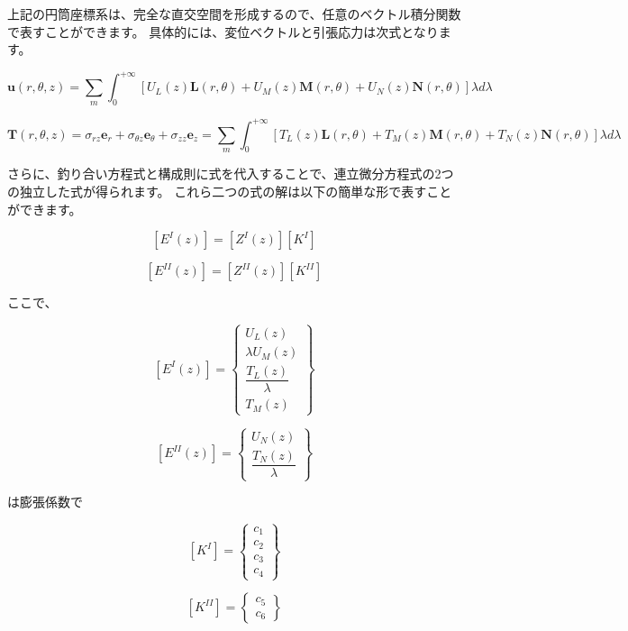 上記の円筒座標系は、完全な直交空間を形成するので、任意のベクトル積分関数で表すことができます。
具体的には、変位ベクトルと引張応力は次式となります。

\[\mathbf{u}\left(r,\theta,z\right)=\sum_{m}\int_{0}^{+\infty}\left[U_{L}\left(z\right)\mathbf{L}\left(r,\theta\right)+U_{M}\left(z\right)\mathbf{M}\left(r,\theta\right)+U_{N}\left(z\right)\mathbf{N}\left(r,\theta\right)\right]\lambda d\lambda\]

\[\mathbf{T}\left(r,\theta,z\right)=\sigma_{rz}\mathbf{e}_{r}+\sigma_{\theta z}\mathbf{e}_{\theta}+\sigma_{zz}\mathbf{e}_{z}=\sum_{m}\int_{0}^{+\infty}\left[T_{L}\left(z\right)\mathbf{L}\left(r,\theta\right)+T_{M}\left(z\right)\mathbf{M}\left(r,\theta\right)+T_{N}\left(z\right)\mathbf{N}\left(r,\theta\right)\right]\lambda d\lambda\]

さらに、釣り合い方程式と構成則に式を代入することで、連立微分方程式の2つの独立した式が得られます。
これら二つの式の解は以下の簡単な形で表すことができます。

\[\left[E^{I}\left(z\right)\right]=\left[Z^{I}\left(z\right)\right]\left[K^{I}\right]\]

\[\left[E^{II}\left(z\right)\right]=\left[Z^{II}\left(z\right)\right]\left[K^{II}\right]\]

ここで、

\[\left[E^{I}\left(z\right)\right]=\left\{ \begin{array}{c}
U_{L}\left(z\right)\\
\lambda U_{M}\left(z\right)\\
\dfrac{T_{L}\left(z\right)}{\lambda}\\
T_{M}\left(z\right)
\end{array}\right\}\]

\[\left[E^{II}\left(z\right)\right]=\left\{ \begin{array}{c}
U_{N}\left(z\right)\\
\dfrac{T_{N}\left(z\right)}{\lambda}
\end{array}\right\}\]

は膨張係数で

\[\left[K^{I}\right]=\left\{ \begin{array}{c}
c_{1}\\
c_{2}\\
c_{3}\\
c_{4}
\end{array}\right\}\]

\[\left[K^{II}\right]=\left\{ \begin{array}{c}
c_{5}\\
c_{6}
\end{array}\right\}\]

